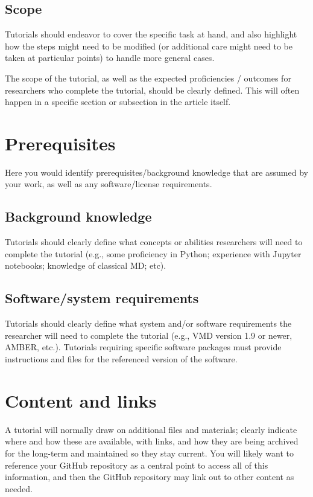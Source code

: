 \documentclass[9pt,tutorial]{livecoms}
\begin{document}
\subsection{Scope}

Tutorials should endeavor to cover the specific task at hand, and also highlight how the steps might need to be modified (or additional care might need to be taken at particular points) to handle more general cases.

The scope of the tutorial, as well as the expected proficiencies / outcomes for researchers who complete the tutorial, should be clearly defined.
This will often happen in a specific section or subsection in the article itself.

\section{Prerequisites}

Here you would identify prerequisites/background knowledge that are assumed by your work, as well as any software/license requirements.

\subsection{Background knowledge}
Tutorials should clearly define what concepts or abilities researchers will need to complete the tutorial (e.g., some proficiency in Python; experience with Jupyter notebooks; knowledge of classical MD; etc).

\subsection{Software/system requirements}
Tutorials should clearly define what system and/or software requirements the researcher will need to complete the tutorial (e.g., VMD version 1.9 or newer, AMBER, etc.). Tutorials requiring specific software packages must provide instructions and files for the referenced version of the software.

\section{Content and links}

A tutorial will normally draw on additional files and materials; clearly indicate where and how these are available, with links, and how they are being archived for the long-term and maintained so they stay current.
You will likely want to reference your GitHub repository as a central point to access all of this information, and then the GitHub repository may link out to other content as needed.
\end{document}
